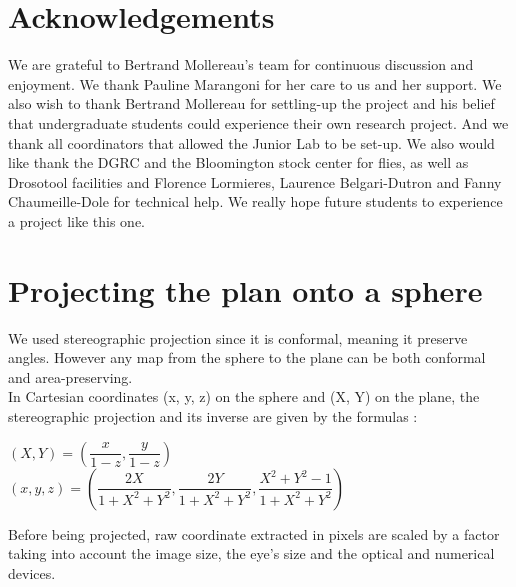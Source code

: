 \documentclass{article}
\begin{document}
\section{Acknowledgements}
We are grateful to Bertrand Mollereau's team for continuous discussion and enjoyment.
We thank Pauline Marangoni for her care to us and her support.
We also wish to thank Bertrand Mollereau for settling-up the project and his belief that undergraduate students could experience their own research project.
And we thank all coordinators that allowed the Junior Lab to be set-up.
We also would like thank the DGRC and the Bloomington stock center for flies, as well as Drosotool facilities and Florence Lormieres, Laurence Belgari-Dutron and Fanny Chaumeille-Dole for technical help. 
We really hope future students to experience a project like this one.

\appendix
	
\section{Projecting the plan onto a sphere}
We used stereographic projection since it is conformal, meaning it preserve angles. However any map from the sphere to the plane can be both conformal and area-preserving. \\
In Cartesian coordinates (x, y, z) on the sphere and (X, Y) on the plane, the stereographic projection and its inverse are given by the formulas :\\
\begin{flushleft}
$\displaystyle (X,Y)=(\dfrac{x}{1-z},\dfrac{y}{1-z})$\\
$\displaystyle (x,y,z)=(\dfrac{2X}{1+X^2+Y^2},\dfrac{2Y}{1+X^2+Y^2},\dfrac{X^2+Y^2-1}{1+X^2+Y^2})$\\
\end{flushleft}
Before being projected, raw coordinate extracted in pixels are scaled by a factor taking into account the image size, the eye's size and the optical and numerical devices. 


\end{document}
